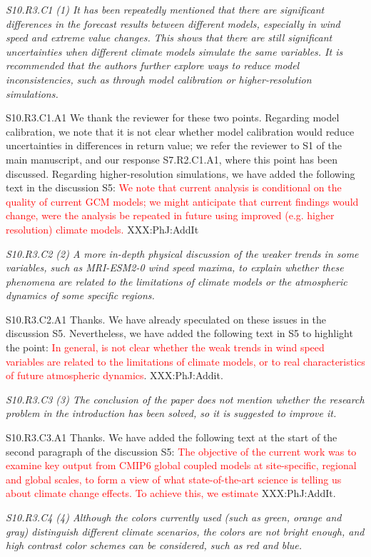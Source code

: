 \documentclass[a4paper,10pt]{article}
\newcommand{\ed}[1]{\textcolor{red}{#1}}
\begin{document}
	\emph{S10.R3.C1 (1) It has been repeatedly mentioned that there are significant differences in the forecast results between different models, especially in wind speed and extreme value changes. This shows that there are still significant uncertainties when different climate models simulate the same variables. It is recommended that the authors further explore ways to reduce model inconsistencies, such as through model calibration or higher-resolution simulations.}

	S10.R3.C1.A1 We thank the reviewer for these two points. Regarding model calibration, we note that it is not clear whether model calibration would reduce uncertainties in differences in return value; we refer the reviewer to S1 of the main manuscript, and our response S7.R2.C1.A1, where this point has been discussed. Regarding higher-resolution simulations, we have added the following text in the discussion S5: \ed{We note that current analysis is conditional on the quality of current GCM models; we might anticipate that current findings would change, were the analysis be repeated in future using improved (e.g. higher resolution) climate models.} XXX:PhJ:AddIt

	\emph{S10.R3.C2 (2) A more in-depth physical discussion of the weaker trends in some variables, such as MRI-ESM2-0 wind speed maxima, to explain whether these phenomena are related to the limitations of climate models or the atmospheric dynamics of some specific regions.}

	S10.R3.C2.A1 Thanks. We have already speculated on these issues in the discussion S5. Nevertheless, we have added the following text in S5 to highlight the point: \ed{In general, is not clear whether the weak trends in wind speed variables are related to the limitations of climate models, or to real characteristics of future atmospheric dynamics}. XXX:PhJ:Addit. 

	\emph{S10.R3.C3 (3) The conclusion of the paper does not mention whether the research problem in the introduction has been solved, so it is suggested to improve it.}

	S10.R3.C3.A1 Thanks. We have added the following text at the start of the second paragraph of the discussion S5: \ed{The objective of the current work was to examine key output from CMIP6 global coupled models at site-specific, regional and global scales, to form a view of what state-of-the-art science is telling us about climate change effects. To achieve this, we estimate} XXX:PhJ:AddIt. 

	\emph{S10.R3.C4 (4) Although the colors currently used (such as green, orange and gray) distinguish different climate scenarios, the colors are not bright enough, and high contrast color schemes can be considered, such as red and blue.}
\end{document}
